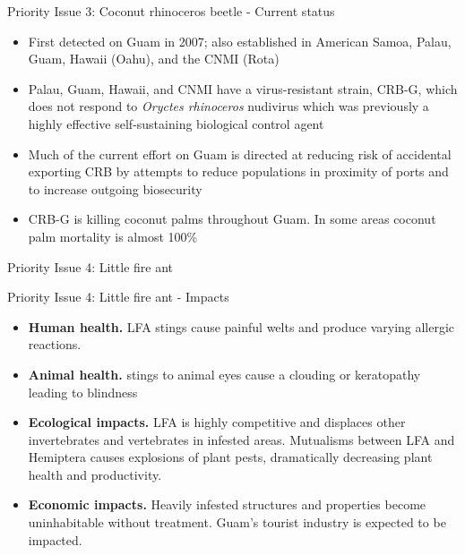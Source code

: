 \documentclass[]{beamer}
\begin{document}
\begin{frame}{Priority Issue 3: Coconut rhinoceros beetle - Current status}
	\begin{itemize}
		\item First detected on Guam in 2007; also established in American Samoa, Palau, Guam, Hawaii (Oahu), and the CNMI (Rota)
		\item Palau, Guam, Hawaii, and CNMI have a virus-resistant strain, CRB-G, which does not respond to \textit{Oryctes rhinoceros} nudivirus which was previously a highly effective self-sustaining biological control agent
		\item Much of the current effort on Guam is directed at reducing risk of accidental exporting CRB by attempts to reduce populations in proximity of ports and to increase outgoing biosecurity 
		\item CRB-G is killing coconut palms throughout Guam. In some areas coconut palm mortality is almost 100\%
	\end{itemize}
\end{frame}

\begin{frame}{Priority Issue 4: Little fire ant}	
	\begin{figure}
	\end{figure}
\end{frame}

\begin{frame}{Priority Issue 4: Little fire ant - Impacts}	
	\begin{itemize}
		\item \textbf{Human health.} LFA stings cause painful welts and produce varying allergic reactions. 
		\item \textbf{Animal health.} stings to animal eyes cause a clouding or keratopathy leading to blindness
		\item \textbf{Ecological impacts.} LFA is highly competitive and displaces other invertebrates and vertebrates in infested areas. Mutualisms between LFA and Hemiptera causes explosions of plant pests, dramatically decreasing plant health and productivity.
		\item \textbf{Economic impacts.} Heavily infested structures and properties become uninhabitable without treatment. Guam's tourist industry is expected to be impacted.				
	\end{itemize}
\end{frame}
\end{document}
